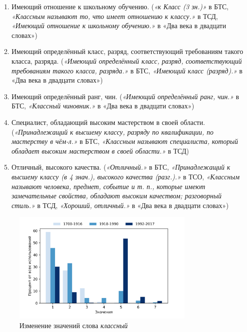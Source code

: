 \begin{enumerate}
    \item Имеющий отношение к школьному обучению.
(\textit{«к Класс (3 зн.)»} в БТС,
\textit{«Классным называют то, что имеет отношению к классу.»} в ТСД,
\textit{«Имеющий отношение к школьному обучению.»} в «Два века в двадцати словах»)

    \item Имеющий определённый класс, разряд, соответствующий требованиям такого класса, разряда.
(\textit{«Имеющий определённый класс, разряд, соответствующий требованиям такого класса, разряда.»} в БТС,
\textit{«Имеющий класс (разряд).»} в «Два века в двадцати словах»)

    \item Имеющий определённый ранг, чин.
(\textit{«Имеющий определённый ранг, чин.»} в БТС,
\textit{«Классный чиновник.»} в «Два века в двадцати словах»)

    \item Специалист, обладающий высоким мастерством в своей области.
(\textit{«Принадлежащий к высшему классу, разряду по квалификации, по мастерству в чём-л.»} в БТС,
\textit{«Классным называют специалиста, который обладает высоким мастерством в своей области.»} в ТСД)

    \item Отличный, высокого качества.
(\textit{«Отличный.»} в БТС,
\textit{«Принадлежащий к высшему классу (в 4 знач.), высокого качества (разг.).»} в ТСО,
\textit{«Классным называют человека, предмет, событие и т. п., которые имеют замечательные свойства,
обладают высоким качеством; разговорный стиль.»} в ТСД,
\textit{«Хороший, отличный.»} в «Два века в двадцати словах»)
\end{enumerate}

\begin{figure}[H]
	\centering
	\includegraphics[width=0.8\textwidth]{img/visualizations/klassnyj_minimal}
	\caption{Изменение значений слова \textit{классный}}
	\label{fig:Классный}
\end{figure}

